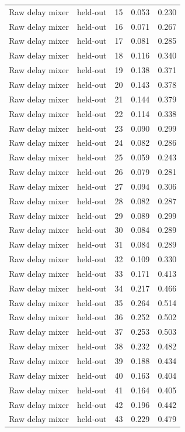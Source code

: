 \begin{tabular}{llrrr}
Raw delay mixer & held-out & 15 & 0.053 & 0.230 \\
Raw delay mixer & held-out & 16 & 0.071 & 0.267 \\
Raw delay mixer & held-out & 17 & 0.081 & 0.285 \\
Raw delay mixer & held-out & 18 & 0.116 & 0.340 \\
Raw delay mixer & held-out & 19 & 0.138 & 0.371 \\
Raw delay mixer & held-out & 20 & 0.143 & 0.378 \\
Raw delay mixer & held-out & 21 & 0.144 & 0.379 \\
Raw delay mixer & held-out & 22 & 0.114 & 0.338 \\
Raw delay mixer & held-out & 23 & 0.090 & 0.299 \\
Raw delay mixer & held-out & 24 & 0.082 & 0.286 \\
Raw delay mixer & held-out & 25 & 0.059 & 0.243 \\
Raw delay mixer & held-out & 26 & 0.079 & 0.281 \\
Raw delay mixer & held-out & 27 & 0.094 & 0.306 \\
Raw delay mixer & held-out & 28 & 0.082 & 0.287 \\
Raw delay mixer & held-out & 29 & 0.089 & 0.299 \\
Raw delay mixer & held-out & 30 & 0.084 & 0.289 \\
Raw delay mixer & held-out & 31 & 0.084 & 0.289 \\
Raw delay mixer & held-out & 32 & 0.109 & 0.330 \\
Raw delay mixer & held-out & 33 & 0.171 & 0.413 \\
Raw delay mixer & held-out & 34 & 0.217 & 0.466 \\
Raw delay mixer & held-out & 35 & 0.264 & 0.514 \\
Raw delay mixer & held-out & 36 & 0.252 & 0.502 \\
Raw delay mixer & held-out & 37 & 0.253 & 0.503 \\
Raw delay mixer & held-out & 38 & 0.232 & 0.482 \\
Raw delay mixer & held-out & 39 & 0.188 & 0.434 \\
Raw delay mixer & held-out & 40 & 0.163 & 0.404 \\
Raw delay mixer & held-out & 41 & 0.164 & 0.405 \\
Raw delay mixer & held-out & 42 & 0.196 & 0.442 \\
Raw delay mixer & held-out & 43 & 0.229 & 0.479 \\

\end{tabular}
